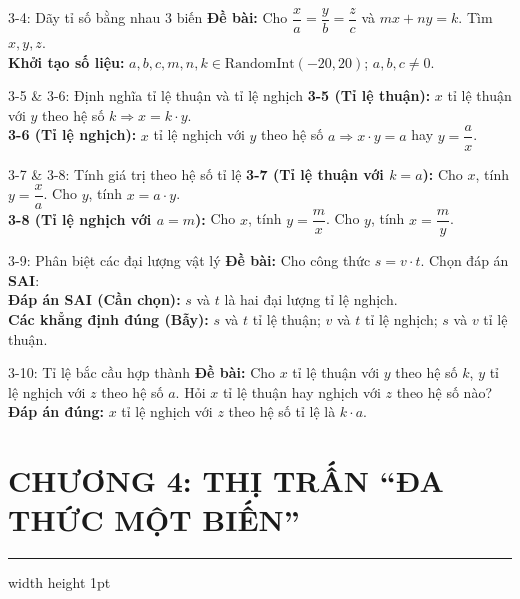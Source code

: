 \documentclass[11pt, a4paper]{article}
\begin{document}
\begin{qbox}{3-4: Dãy tỉ số bằng nhau 3 biến}
\textbf{Đề bài:} Cho $\dfrac{x}{a} = \dfrac{y}{b} = \dfrac{z}{c}$ và $mx + ny = k$. Tìm $x, y, z$. \\[0.3em]
\textbf{Khởi tạo số liệu:} $a, b, c, m, n, k \in \text{RandomInt}(-20, 20)$; $a, b, c \neq 0$.
\end{qbox}

\begin{qbox}{3-5 \& 3-6: Định nghĩa tỉ lệ thuận và tỉ lệ nghịch}
\textbf{3-5 (Tỉ lệ thuận):} $x$ tỉ lệ thuận với $y$ theo hệ số $k \Rightarrow x = k \cdot y$. \\[0.3em]
\textbf{3-6 (Tỉ lệ nghịch):} $x$ tỉ lệ nghịch với $y$ theo hệ số $a \Rightarrow x \cdot y = a$ hay $y = \dfrac{a}{x}$.
\end{qbox}

\begin{qbox}{3-7 \& 3-8: Tính giá trị theo hệ số tỉ lệ}
\textbf{3-7 (Tỉ lệ thuận với $k = a$):} Cho $x$, tính $y = \dfrac{x}{a}$. Cho $y$, tính $x = a \cdot y$. \\[0.3em]
\textbf{3-8 (Tỉ lệ nghịch với $a = m$):} Cho $x$, tính $y = \dfrac{m}{x}$. Cho $y$, tính $x = \dfrac{m}{y}$.
\end{qbox}

\begin{qbox}{3-9: Phân biệt các đại lượng vật lý}
\textbf{Đề bài:} Cho công thức $s = v \cdot t$. Chọn đáp án \textbf{SAI}: \\[0.3em]
\textbf{Đáp án SAI (Cần chọn):} $s$ và $t$ là hai đại lượng tỉ lệ nghịch. \\[0.3em]
\textbf{Các khẳng định đúng (Bẫy):} $s$ và $t$ tỉ lệ thuận; $v$ và $t$ tỉ lệ nghịch; $s$ và $v$ tỉ lệ thuận.
\end{qbox}

\begin{qbox}{3-10: Tỉ lệ bắc cầu hợp thành}
\textbf{Đề bài:} Cho $x$ tỉ lệ thuận với $y$ theo hệ số $k$, $y$ tỉ lệ nghịch với $z$ theo hệ số $a$. Hỏi $x$ tỉ lệ thuận hay nghịch với $z$ theo hệ số nào? \\[0.3em]
\textbf{Đáp án đúng:} $x$ tỉ lệ nghịch với $z$ theo hệ số tỉ lệ là $k \cdot a$.
\end{qbox}

\pagebreak

\section*{\Large \color{primary} CHƯƠNG 4: THỊ TRẤN “ĐA THỨC MỘT BIẾN”}
\hrule width \hsize height 1pt
\vspace{1em}
\end{document}
